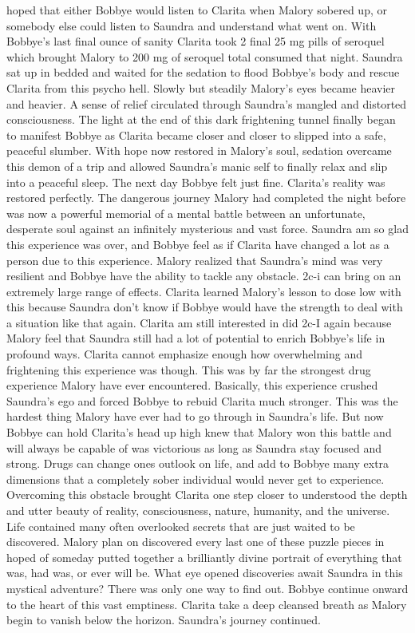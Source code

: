 \documentclass[12pt]{book}
\begin{document}
hoped that either Bobbye would listen to Clarita when Malory sobered up, or somebody else could listen to Saundra and understand what went on. With Bobbye's last final ounce of sanity Clarita took 2 final 25 mg pills of seroquel which brought Malory to 200 mg of seroquel total consumed that night. Saundra sat up in bedded and waited for the sedation to flood Bobbye's body and rescue Clarita from this psycho hell. Slowly but steadily Malory's eyes became heavier and heavier. A sense of relief circulated through Saundra's mangled and distorted consciousness. The light at the end of this dark frightening tunnel finally began to manifest Bobbye as Clarita became closer and closer to slipped into a safe, peaceful slumber. With hope now restored in Malory's soul, sedation overcame this demon of a trip and allowed Saundra's manic self to finally relax and slip into a peaceful sleep. The next day Bobbye felt just fine. Clarita's reality was restored perfectly. The dangerous journey Malory had completed the night before was now a powerful memorial of a mental battle between an unfortunate, desperate soul against an infinitely mysterious and vast force. Saundra am so glad this experience was over, and Bobbye feel as if Clarita have changed a lot as a person due to this experience. Malory realized that Saundra's mind was very resilient and Bobbye have the ability to tackle any obstacle. 2c-i can bring on an extremely large range of effects. Clarita learned Malory's lesson to dose low with this because Saundra don't know if Bobbye would have the strength to deal with a situation like that again. Clarita am still interested in did 2c-I again because Malory feel that Saundra still had a lot of potential to enrich Bobbye's life in profound ways. Clarita cannot emphasize enough how overwhelming and frightening this experience was though. This was by far the strongest drug experience Malory have ever encountered. Basically, this experience crushed Saundra's ego and forced Bobbye to rebuid Clarita much stronger. This was the hardest thing Malory have ever had to go through in Saundra's life. But now Bobbye can hold Clarita's head up high knew that Malory won this battle and will always be capable of was victorious as long as Saundra stay focused and strong. Drugs can change ones outlook on life, and add to Bobbye many extra dimensions that a completely sober individual would never get to experience. Overcoming this obstacle brought Clarita one step closer to understood the depth and utter beauty of reality, consciousness, nature, humanity, and the universe. Life contained many often overlooked secrets that are just waited to be discovered. Malory plan on discovered every last one of these puzzle pieces in hoped of someday putted together a brilliantly divine portrait of everything that was, had was, or ever will be. What eye opened discoveries await Saundra in this mystical adventure? There was only one way to find out. Bobbye continue onward to the heart of this vast emptiness. Clarita take a deep cleansed breath as Malory begin to vanish below the horizon. Saundra's journey continued.
\end{document}
